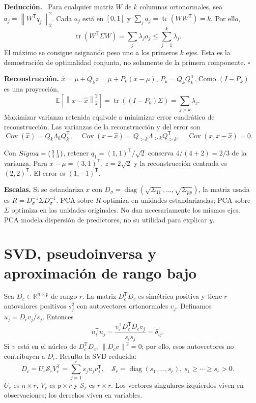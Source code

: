 \documentclass[11pt,a4paper]{article}
\newcommand{\R}{\mathbb R}
\newcommand{\E}{\mathbb E}
\newcommand{\T}{^{\mathsf T}}
\newcommand{\norm}[1]{\left\lVert #1\right\rVert}
\DeclareMathOperator{\Cov}{Cov}
\DeclareMathOperator{\tr}{tr}
\DeclareMathOperator{\diag}{diag}
\newcommand{\topic}[2]{\clearpage\section{#1}\label{#2}}
\newenvironment{deduccion}{\par\textbf{Deducción.}\ }{\hfill$\square$\par}
\theoremstyle{definition}\newtheorem{definicion}[teorema]{Definición}
\begin{document}
\begin{deduccion}
Para cualquier matriz $W$ de $k$ columnas ortonormales, sea
$a_j=\norm{W\T q_j}_2^2$. Cada $a_j$ está en $[0,1]$ y
$\sum_ja_j=\tr(WW\T)=k$.
Por ello,
\[
\tr(W\T\Sigma W)=\sum_j\lambda_ja_j\le\sum_{j=1}^k\lambda_j.
\]
El máximo se consigue asignando peso uno a los primeros $k$ ejes.
Esta es la demostración de optimalidad conjunta, no solamente de
la primera componente.
\end{deduccion}
\textbf{Reconstrucción.}
$\widehat x=\mu+Q_kz=\mu+P_k(x-\mu)$, $P_k=Q_kQ_k\T$.
Como $(I-P_k)$ es una proyección,
\[
\E[\norm{x-\widehat x}_2^2]
=\tr((I-P_k)\Sigma)
=\boxed{\sum_{j>k}\lambda_j}.
\]
Maximizar varianza retenida equivale a minimizar error cuadrático
de reconstrucción. Las varianzas de la reconstrucción y del error son
\[
\Cov(\widehat x)=Q_k\Lambda_kQ_k\T,\quad
\Cov(x-\widehat x)=Q_{>k}\Lambda_{>k}Q_{>k}\T,
\quad \Cov(\widehat x,x-\widehat x)=0.
\]
\begin{ejemplo}
Con $\Sigma=\begin{psmallmatrix}3&1\\1&3\end{psmallmatrix}$,
retener $q_1=(1,1)\T/\sqrt2$ conserva $4/(4+2)=2/3$ de la varianza.
Para $x-\mu=(3,1)\T$, $z=2\sqrt2$ y la reconstrucción centrada es
$(2,2)\T$. El error es $(1,-1)\T$.
\end{ejemplo}
\textbf{Escalas.} Si se estandariza $x$ con
$D_\sigma=\diag(\sqrt{\Sigma_{11}},\ldots,\sqrt{\Sigma_{pp}})$,
la matriz usada es $R=D_\sigma^{-1}\Sigma D_\sigma^{-1}$.
PCA sobre $R$ optimiza en unidades estandarizadas; PCA sobre $\Sigma$
optimiza en las unidades originales. No dan necesariamente los mismos ejes.
PCA modela dispersión de predictores, no su utilidad para explicar $y$.

\topic{SVD, pseudoinversa y aproximación de rango bajo}{s29}
Sea $D_c\in\R^{n\times p}$ de rango $r$.
La matriz $D_c\T D_c$ es simétrica positiva y tiene $r$ autovalores
positivos $s_j^2$ con autovectores ortonormales $v_j$.
Definamos $u_j=D_cv_j/s_j$. Entonces
\[
u_i\T u_j=\frac{v_i\T D_c\T D_cv_j}{s_is_j}=\delta_{ij}.
\]
Si $v$ está en el núcleo de $D_c\T D_c$, $\norm{D_cv}^2=0$;
por ello, esos autovectores no contribuyen a $D_c$.
Resulta la SVD reducida:
\[
\boxed{D_c=U_r\mathcal S_rV_r\T
=\sum_{j=1}^rs_ju_jv_j\T},
\quad \mathcal S_r=\diag(s_1,\ldots,s_r),\ s_1\ge\cdots\ge s_r>0.
\]
$U_r$ es $n\times r$, $V_r$ es $p\times r$ y
$\mathcal S_r$ es $r\times r$. Los vectores singulares izquierdos viven
en observaciones; los derechos viven en variables.
\end{document}
